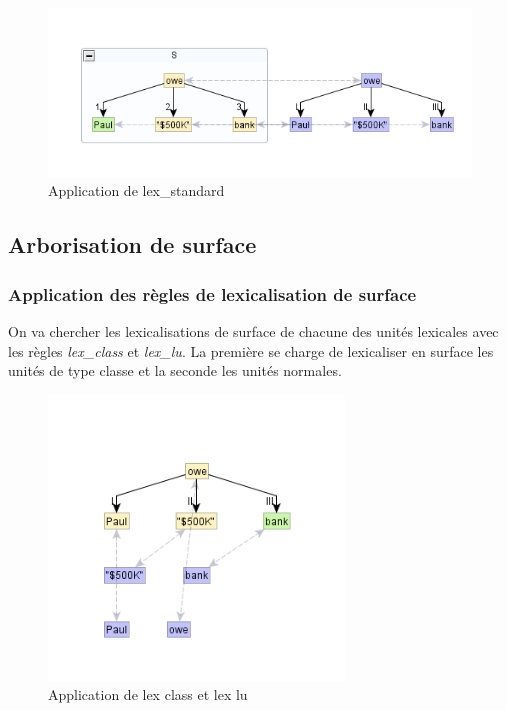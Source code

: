 \begin{figure}[htb]
	\centering
	\includegraphics[width=1\textwidth, trim = {0cm 0cm 0cm 0cm},clip]{ch3/figs/lex_standard2.png}
	\caption{Application de lex\_standard}
	\label{fig:lexstand2}
\end{figure}


\subsection{Arborisation de surface}

\subsubsection{Application des règles de lexicalisation de surface}
On va chercher les lexicalisations de surface de chacune des unités lexicales avec les règles \emph{lex\_class} et \emph{lex\_lu}. La première se charge de lexicaliser en surface les unités de type classe et la seconde les unités normales. \FL{\ldots}

\begin{figure}[htb]
	\centering
	\includegraphics[width=0.7\textwidth, trim = {0cm 0cm 0cm 0cm},clip]{ch3/figs/rsyntslexicalisation1.png}
	\caption{Application de lex class et lex lu}
	\label{fig:lexsurf}
\end{figure}

